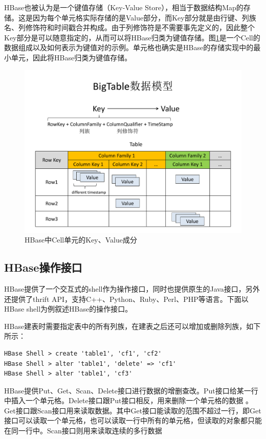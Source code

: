HBase也被认为是一个键值存储（Key-Value Store），相当于数据结构Map的存储。这是因为每个单元格实际存储的是Value部分，而Key部分就是由行键、列族名、列修饰符和时间戳合并构成。由于列修饰符是不需要事先定义的，因此整个Key部分是可以随意指定的，从而可以将HBase归类为键值存储。图\ref{fig:hbase_cell}是一个Cell的数据组成以及如何表示为键值对的示例。单元格也确实是HBase的存储实现中的最小单元，因此将HBase归类为键值存储。

\begin{figure}[htbp]
\centering
\includegraphics[width=120mm]{fig/HBase_key_value.pdf}
\caption{HBase中Cell单元的Key、Value成分}
\label{fig:hbase_cell}
\end{figure}

\subsection{HBase操作接口}
HBase提供了一个交互式的shell作为操作接口，同时也提供原生的Java接口，另外还提供了thrift API，支持C++、Python、Ruby、Perl、PHP等语言。下面以HBase shell为例叙述HBase的操作接口。

HBase建表时需要指定表中的所有列族，在建表之后还可以增加或删除列族，如下所示：
\begin{verbatim}
HBase Shell > create 'table1', 'cf1', 'cf2'
HBase Shell > alter 'table1', 'delete' => 'cf1'
HBase Shell > alter 'table1', 'cf3'
\end{verbatim}

HBase提供Put、Get、Scan、Delete接口进行数据的增删查改。Put接口给某一行中插入一个单元格。Delete接口跟Put接口相反，用来删除一个单元格的数据 。Get接口跟Scan接口用来读取数据。其中Get接口能读取的范围不超过一行，即Get接口可以读取一个单元格，也可以读取一行中所有的单元格，但读取的对象都只能在同一行中。Scan接口则用来读取连续的多行数据


